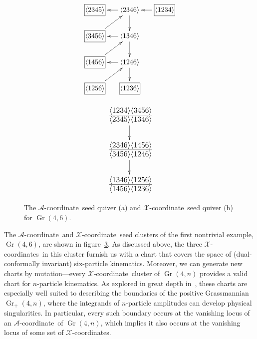 \documentclass[12pt]{article}
\DeclareMathOperator{\Gr}{Gr}
\def\ket#1{\langle #1 \rangle}
\def\xcoord{$\mathcal{X}$-coordinate}
\def\xcoords{$\mathcal{X}$-coordinates}
\def\acoord{$\mathcal{A}$-coordinate}
\begin{document}
\begin{figure}[t]
\centering
\begin{subfigure}[b]{0.45\textwidth}
\begin{equation*}
\begin{gathered}
\begin{xy} 0;<-.5pt,0pt>:<0pt,-.5pt>::
         (-100,0) *+{\framebox[7ex]{$\ket{1234}$}} ="0",
	(0,0) *+{\ket{2346}} ="1",
	(100,0) *+{\framebox[7ex]{$\ket{2345}$}} ="2",
	(0,75) *+{\ket{1346}} ="3",
	(100,75) *+{\framebox[7ex]{$\ket{3456}$}} ="4",
	(0,150) *+{\ket{1246}} ="5",
	(100,150) *+{\framebox[7ex]{$\ket{1456}$}} ="6",
	(0,225) *+{\framebox[7ex]{$\ket{1236}$}} ="7",
	(100,225) *+{\framebox[7ex]{$\ket{1256}$}} ="8",
	"0", {\ar"1"},
	"1", {\ar"2"},
	"3", {\ar"4"},
	"5", {\ar"6"},
	"1", {\ar"3"},
	"3", {\ar"5"},
	"5", {\ar"7"},
	"4", {\ar"1"},
	"6", {\ar"3"},
	"8", {\ar"5"},
\end{xy}
\end{gathered} 
\end{equation*}
\caption{} \label{fig:g46-a-seed}
\end{subfigure}
\hspace*{\fill} 
\begin{subfigure}[b]{0.45\textwidth}
\begin{equation*}
\begin{gathered}
\begin{xy} 0;<-.5pt,0pt>:<0pt,-.5pt>::
	(0,0) *+\txt{\fontsize{16pt}{16pt} $\frac{\ket{1234}\ket{3456}}{\ket{2345}\ket{1346}}$} ="1",
	(0,100) *+\txt{\fontsize{16pt}{16pt} $\frac{\ket{2346}\ket{1456}}{\ket{3456}\ket{1246}}$} ="3",
	(0,200) *+\txt{\fontsize{16pt}{16pt} $\frac{\ket{1346}\ket{1256}}{\ket{1456}\ket{1236}}$} ="5",
	"1", {\ar"3"},
	"3", {\ar"5"},
\end{xy}
\end{gathered} 
\end{equation*}
\caption{} \label{fig:g46-x-seed}
\end{subfigure}
\caption{The \acoord\ seed quiver (a) and \xcoord\ seed quiver (b) for $\Gr(4,6)$.} 
\label{fig:g46-seed}
\end{figure}

The \acoord\ and \xcoord\ seed clusters of the first nontrivial example, $\Gr(4,6)$, are shown in figure~\ref{fig:g46-seed}. As discussed above, the three \xcoords\ in this cluster furnish us with a chart that covers the space of (dual-conformally invariant) six-particle kinematics. Moreover, we can generate new charts by mutation---every \xcoord\ cluster of $\Gr(4,n)$ provides a valid chart for $n$-particle kinematics. As explored in great depth in~\cite{ArkaniHamed:2012nw}, these charts are especially well suited to describing the boundaries of the positive Grassmannian $\Gr_+(4,n)$, where the integrands of $n$-particle amplitudes can develop physical singularities. In particular, every such boundary occurs at the vanishing locus of an \acoord\ of $\Gr(4,n)$, which implies it also occurs at the vanishing locus of some set of \xcoords.  
\end{document}
